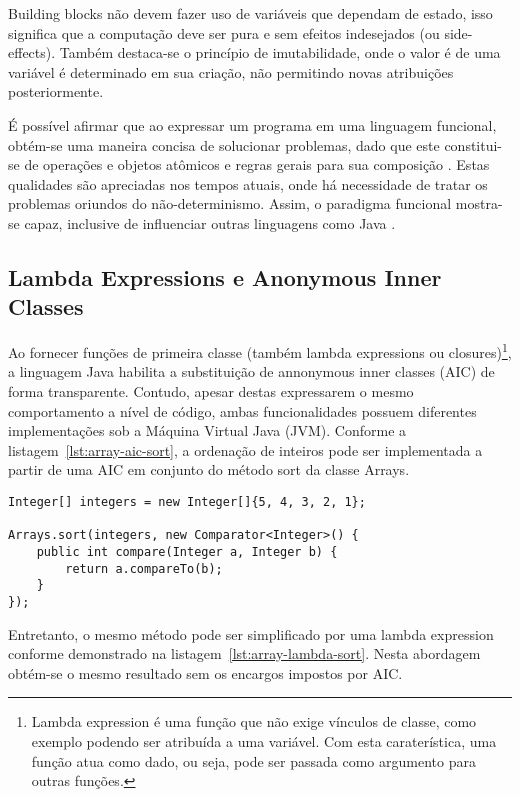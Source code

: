 \documentclass[10pt, conference]{IEEEtran}
\begin{document}
Building blocks não devem fazer uso de variáveis que dependam de estado, isso significa que a computação deve ser pura e sem efeitos indesejados (ou side-effects). Também destaca-se o princípio de imutabilidade, onde o valor é de uma variável é determinado em sua criação, não permitindo novas atribuições posteriormente.

É possível afirmar que ao expressar um programa em uma linguagem funcional, obtém-se uma maneira concisa de solucionar problemas, dado que este constitui-se de operações e objetos atômicos e regras gerais para sua composição \cite{michaelson2011introduction}. Estas qualidades são apreciadas nos tempos atuais, onde há necessidade de tratar os problemas oriundos do não-determinismo. Assim, o paradigma funcional mostra-se capaz, inclusive de influenciar outras linguagens como Java \cite{jsr335}.

\subsection{Lambda Expressions e Anonymous Inner Classes}
Ao fornecer funções de primeira classe (também lambda expressions ou closures)\footnote{Lambda expression é uma função que não exige vínculos de classe, como exemplo podendo ser atribuída a uma variável. Com esta caraterística, uma função atua como dado, ou seja, pode ser passada como argumento para outras funções.}, a linguagem Java habilita a substituição de annonymous inner classes (AIC) de forma transparente. Contudo, apesar destas expressarem o mesmo comportamento a nível de código, ambas funcionalidades possuem diferentes implementações sob a Máquina Virtual Java (JVM). Conforme a listagem~\ref{lst:array-aic-sort}, a ordenação de inteiros pode ser implementada a partir de uma AIC em conjunto do método sort da classe Arrays.

\begin{lstlisting}[caption={Sort - Anonymous Inner Class}, label={lst:array-aic-sort}]
Integer[] integers = new Integer[]{5, 4, 3, 2, 1};

Arrays.sort(integers, new Comparator<Integer>() {
    public int compare(Integer a, Integer b) {
        return a.compareTo(b);
    }
});
\end{lstlisting}

Entretanto, o mesmo método pode ser simplificado por uma lambda expression conforme demonstrado na listagem~\ref{lst:array-lambda-sort}. Nesta abordagem obtém-se o mesmo resultado sem os encargos impostos por AIC.
\end{document}
